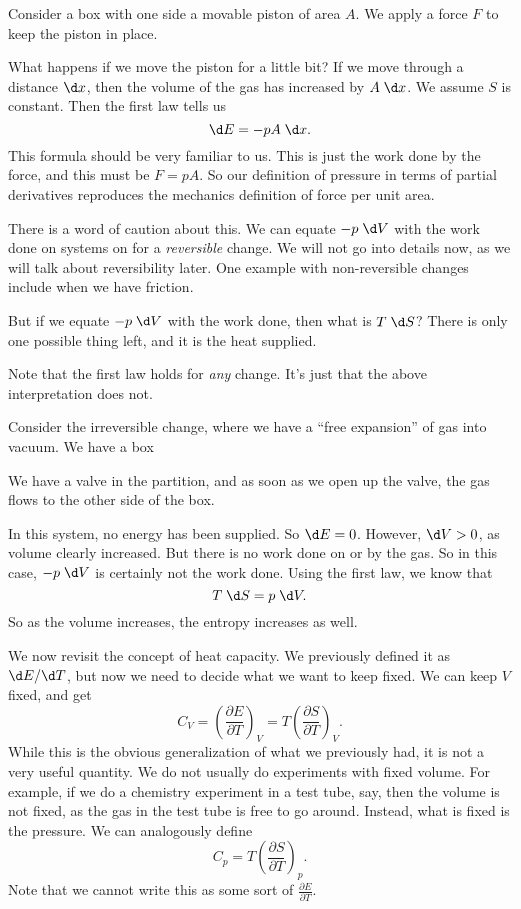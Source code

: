 \documentclass[a4paper]{article}
\begin{document}
\begin{eg}
  Consider a box with one side a movable piston of area $A$. We apply a force $F$ to keep the piston in place.

  What happens if we move the piston for a little bit? If we move through a distance $\d x$, then the volume of the gas has increased by $A \;\d x$. We assume $S$ is constant. Then the first law tells us
  \[
    \d E = -pA \;\d x.
  \]
  This formula should be very familiar to us. This is just the work done by the force, and this must be $F = pA$. So our definition of pressure in terms of partial derivatives reproduces the mechanics definition of force per unit area.
\end{eg}

There is a word of caution about this. We can equate $-p \;\d V$ with the work done on systems on for a \emph{reversible} change. We will not go into details now, as we will talk about reversibility later. One example with non-reversible changes include when we have friction.

But if we equate $-p \;\d V$ with the work done, then what is $T \;\d S$? There is only one possible thing left, and it is the heat supplied.

Note that the first law holds for \emph{any} change. It's just that the above interpretation does not.
\begin{eg}
  Consider the irreversible change, where we have a ``free expansion'' of gas into vacuum. We have a box
  \begin{center}
  \end{center}
  We have a valve in the partition, and as soon as we open up the valve, the gas flows to the other side of the box.

  In this system, no energy has been supplied. So $\d E = 0$. However, $\d V > 0$, as volume clearly increased. But there is no work done on or by the gas. So in this case, $-p \;\d V$ is certainly not the work done. Using the first law, we know that
  \[
    T \;\d S = p \;\d V.
  \]
  So as the volume increases, the entropy increases as well.
\end{eg}

We now revisit the concept of heat capacity. We previously defined it as $\d E/\d T$, but now we need to decide what we want to keep fixed. We can keep $V$ fixed, and get
\[
  C_V = \left(\frac{\partial E}{\partial T}\right)_V = T \left(\frac{\partial S}{\partial T}\right)_V.
\]
While this is the obvious generalization of what we previously had, it is not a very useful quantity. We do not usually do experiments with fixed volume. For example, if we do a chemistry experiment in a test tube, say, then the volume is not fixed, as the gas in the test tube is free to go around. Instead, what is fixed is the pressure. We can analogously define
\[
  C_p = T \left(\frac{\partial S}{\partial T}\right)_p.
\]
Note that we cannot write this as some sort of $\frac{\partial E}{\partial T}$.
\end{document}
